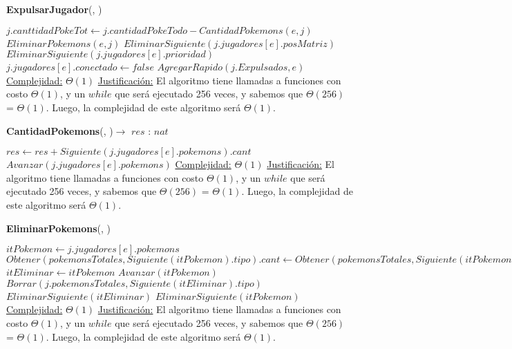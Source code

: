 \begin{algorithm}[H]{\textbf{ExpulsarJugador}(, )}   
    \begin{algorithmic}[1]
        \State $j.canttidadPokeTot \gets j.cantidadPokeTodo - CantidadPokemons(e,j)$
        \State $EliminarPokemons(e,j)$
        \State $EliminarSiguiente(j.jugadores[e].posMatriz)$
            \State $EliminarSiguiente(j.jugadores[e].prioridad)$
        \EndIf
        \State $j.jugadores[e].conectado \gets false$
        \State $AgregarRapido(j.Expulsados, e)$
        \medskip
        \Statex \underline{Complejidad:} $\Theta(1)$
        \Statex \underline{Justificación:}  El algoritmo tiene llamadas a funciones con costo $\Theta(1)$, y un $while$ que será ejecutado 256 veces, y sabemos que $\Theta (256)$ = $\Theta (1)$. Luego, la complejidad de este algoritmo será $\Theta (1)$.
    \end{algorithmic}
\end{algorithm} 

\begin{algorithm}[H]{\textbf{CantidadPokemons}(, )$\to$ $res$ : $nat$}   
    \begin{algorithmic}[1]
            \State $res \gets res + Siguiente(j.jugadores[e].pokemons).cant$
            \State $Avanzar(j.jugadores[e].pokemons)$
        \EndWhile
        \medskip
        \Statex \underline{Complejidad:} $\Theta(1)$
        \Statex \underline{Justificación:}  El algoritmo tiene llamadas a funciones con costo $\Theta(1)$, y un $while$ que será ejecutado 256 veces, y sabemos que $\Theta (256)$ = $\Theta (1)$. Luego, la complejidad de este algoritmo será $\Theta (1)$.
    \end{algorithmic}
\end{algorithm} 

\begin{algorithm}[H]{\textbf{EliminarPokemons}(, )}  
    \begin{algorithmic}[1]
        \State $itPokemon \gets j.jugadores[e].pokemons$
            \State $Obtener(pokemonsTotales, Siguiente(itPokemon).tipo).cant \gets Obtener(pokemonsTotales, Siguiente(itPokemon).tipo).cant - Siguiente(itPokemon).cant$
                \State $itEliminar \gets itPokemon$
                \State $Avanzar(itPokemon)$
                \State $Borrar(j.pokemonsTotales, Siguiente(itEliminar).tipo)$
                \State $EliminarSiguiente(itEliminar)$
            \Else
                \State $EliminarSiguiente(itPokemon)$
            \EndIf      
        \EndWhile
        \medskip
        \Statex \underline{Complejidad:} $\Theta(1)$
        \Statex \underline{Justificación:}  El algoritmo tiene llamadas a funciones con costo $\Theta(1)$, y un $while$ que será ejecutado 256 veces, y sabemos que $\Theta (256)$ = $\Theta (1)$. Luego, la complejidad de este algoritmo será $\Theta (1)$.
    \end{algorithmic}
\end{algorithm} 

